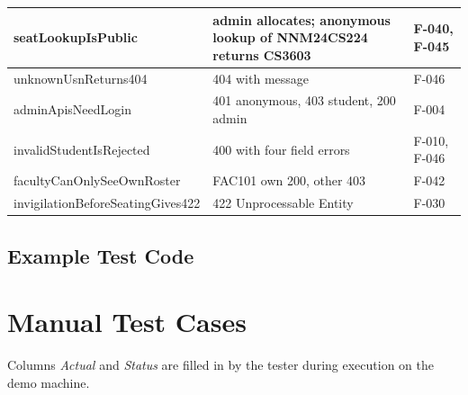 \documentclass[11pt,a4paper]{article}
\newcommand{\src}{../../src}
\begin{document}
\begin{longtable}{|p{5.2cm}|p{6.4cm}|p{1.8cm}|}
seatLookupIsPublic & admin allocates; anonymous lookup of NNM24CS224 returns CS3603 & F-040, F-045\\\hline
unknownUsnReturns404 & 404 with message & F-046\\\hline
adminApisNeedLogin & 401 anonymous, 403 student, 200 admin & F-004\\\hline
invalidStudentIsRejected & 400 with four field errors & F-010, F-046\\\hline
facultyCanOnlySeeOwnRoster & FAC101 own 200, other 403 & F-042\\\hline
invigilationBeforeSeatingGives422 & 422 Unprocessable Entity & F-030\\\hline
\end{longtable}

\subsection{Example Test Code}


\section{Manual Test Cases}
Columns \emph{Actual} and \emph{Status} are filled in by the tester during execution on the demo machine.
\end{document}
